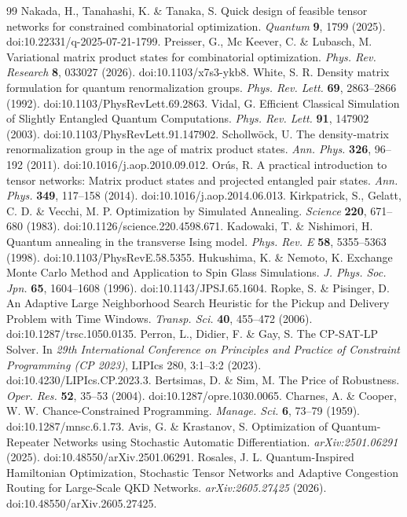\documentclass[pdflatex,sn-nature]{sn-jnl}
\theoremstyle{plain}
\theoremstyle{remark}
\begin{document}
\begin{thebibliography}{99}
 Nakada, H., Tanahashi, K. \& Tanaka, S. Quick design of feasible tensor networks for constrained combinatorial optimization. \textit{Quantum} \textbf{9}, 1799 (2025). doi:10.22331/q-2025-07-21-1799.
 Preisser, G., Mc Keever, C. \& Lubasch, M. Variational matrix product states for combinatorial optimization. \textit{Phys. Rev. Research} \textbf{8}, 033027 (2026). doi:10.1103/x7s3-ykb8.
 White, S. R. Density matrix formulation for quantum renormalization groups. \textit{Phys. Rev. Lett.} \textbf{69}, 2863--2866 (1992). doi:10.1103/PhysRevLett.69.2863.
 Vidal, G. Efficient Classical Simulation of Slightly Entangled Quantum Computations. \textit{Phys. Rev. Lett.} \textbf{91}, 147902 (2003). doi:10.1103/PhysRevLett.91.147902.
 Schollw{\"o}ck, U. The density-matrix renormalization group in the age of matrix product states. \textit{Ann. Phys.} \textbf{326}, 96--192 (2011). doi:10.1016/j.aop.2010.09.012.
 Or{\'u}s, R. A practical introduction to tensor networks: Matrix product states and projected entangled pair states. \textit{Ann. Phys.} \textbf{349}, 117--158 (2014). doi:10.1016/j.aop.2014.06.013.
 Kirkpatrick, S., Gelatt, C. D. \& Vecchi, M. P. Optimization by Simulated Annealing. \textit{Science} \textbf{220}, 671--680 (1983). doi:10.1126/science.220.4598.671.
 Kadowaki, T. \& Nishimori, H. Quantum annealing in the transverse Ising model. \textit{Phys. Rev. E} \textbf{58}, 5355--5363 (1998). doi:10.1103/PhysRevE.58.5355.
 Hukushima, K. \& Nemoto, K. Exchange Monte Carlo Method and Application to Spin Glass Simulations. \textit{J. Phys. Soc. Jpn.} \textbf{65}, 1604--1608 (1996). doi:10.1143/JPSJ.65.1604.
 Ropke, S. \& Pisinger, D. An Adaptive Large Neighborhood Search Heuristic for the Pickup and Delivery Problem with Time Windows. \textit{Transp. Sci.} \textbf{40}, 455--472 (2006). doi:10.1287/trsc.1050.0135.
 Perron, L., Didier, F. \& Gay, S. The CP-SAT-LP Solver. In \textit{29th International Conference on Principles and Practice of Constraint Programming (CP 2023)}, LIPIcs 280, 3:1--3:2 (2023). doi:10.4230/LIPIcs.CP.2023.3.
 Bertsimas, D. \& Sim, M. The Price of Robustness. \textit{Oper. Res.} \textbf{52}, 35--53 (2004). doi:10.1287/opre.1030.0065.
 Charnes, A. \& Cooper, W. W. Chance-Constrained Programming. \textit{Manage. Sci.} \textbf{6}, 73--79 (1959). doi:10.1287/mnsc.6.1.73.
 Avis, G. \& Krastanov, S. Optimization of Quantum-Repeater Networks using Stochastic Automatic Differentiation. \textit{arXiv:2501.06291} (2025). doi:10.48550/arXiv.2501.06291.
 Rosales, J. L. Quantum-Inspired Hamiltonian Optimization, Stochastic Tensor Networks and Adaptive Congestion Routing for Large-Scale QKD Networks. \textit{arXiv:2605.27425} (2026). doi:10.48550/arXiv.2605.27425.

\end{thebibliography}
\end{document}
